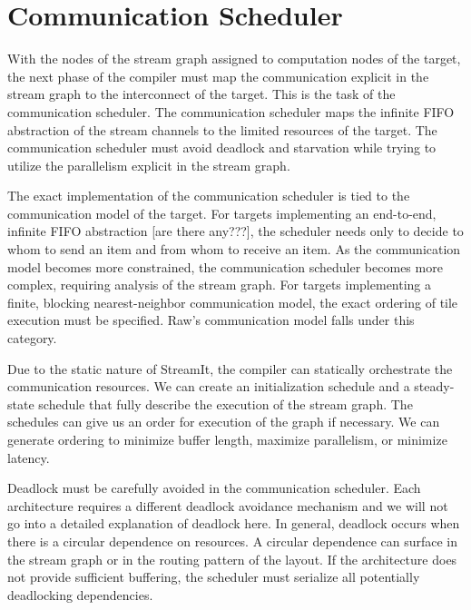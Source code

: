\section{Communication Scheduler}
\label{sec:communic}

With the nodes of the stream graph assigned to computation nodes of
the target, the next phase of the compiler must map the communication
explicit in the stream graph to the interconnect of the target.  This
is the task of the communication scheduler.  The communication
scheduler maps the infinite FIFO abstraction of the stream channels to
the limited resources of the target.  The communication scheduler must
avoid deadlock and starvation while trying to utilize the parallelism
explicit in the stream graph.

The exact implementation of the communication scheduler is tied to the
communication model of the target.  For targets implementing an
end-to-end, infinite FIFO abstraction [are there any???], the
scheduler needs only to decide to whom to send an item and from whom
to receive an item.  As the communication model becomes more
constrained, the communication scheduler becomes more complex,
requiring analysis of the stream graph. For targets implementing a
finite, blocking nearest-neighbor communication model, the exact
ordering of tile execution must be specified.  Raw's communication
model falls under this category.

Due to the static nature of StreamIt, the compiler can statically
orchestrate the communication resources.  We can create an
initialization schedule and a steady-state schedule that fully
describe the execution of the stream graph.  The schedules can give us
an order for execution of the graph if necessary.  We can generate
ordering to minimize buffer length, maximize parallelism, or minimize
latency.  


Deadlock must be carefully avoided in the communication
scheduler. Each architecture requires a different deadlock avoidance
mechanism and we will not go into a detailed explanation of deadlock
here.  In general, deadlock occurs when there is a circular dependence
on resources.  A circular dependence can surface in the stream graph
or in the routing pattern of the layout.  If the architecture does not
provide sufficient buffering, the scheduler must serialize all
potentially deadlocking dependencies.

